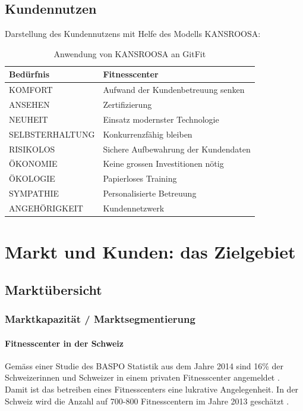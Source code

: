 \subsection{Kundennutzen}
Darstellung des Kundennutzens mit Helfe des Modells KANSROOSA:
\begin{table}[h]
	\centering
	\begin{tabu} to \linewidth {l l}
		\toprule 
		Bedürfnis & Fitnesscenter \\
		\midrule
		KOMFORT & Aufwand der Kundenbetreuung senken \\
		ANSEHEN & Zertifizierung \\
		NEUHEIT & Einsatz modernster Technologie \\
		SELBSTERHALTUNG & Konkurrenzfähig bleiben \\
		RISIKOLOS & Sichere Aufbewahrung der Kundendaten \\
		ÖKONOMIE & Keine grossen Investitionen nötig \\
		ÖKOLOGIE & Papierloses Training \\
		SYMPATHIE & Personalisierte Betreuung \\
		ANGEHÖRIGKEIT & Kundennetzwerk \\
		\bottomrule 
	\end{tabu} 
	\caption{Anwendung von KANSROOSA an GitFit}
\end{table}

\section{Markt und Kunden: das Zielgebiet}

\subsection{Marktübersicht}

\subsubsection{Marktkapazität / Marktsegmentierung}\label{sec:marktkapazitat}

\paragraph{Fitnesscenter in der Schweiz}
Gemäss einer Studie des BASPO Statistik aus dem Jahre 2014 sind 16\% der Schweizerinnen und Schweizer in einem privaten Fitnesscenter angemeldet \cite{schweizer+fitness}. Damit ist das betreiben eines Fitnesscenters eine lukrative Angelegenheit. In der Schweiz wird die Anzahl auf 700-800 Fitnesscentern im Jahre 2013 geschätzt \cite{fitness-studios+1+milliarde}\cite{fitness+tribune}.


